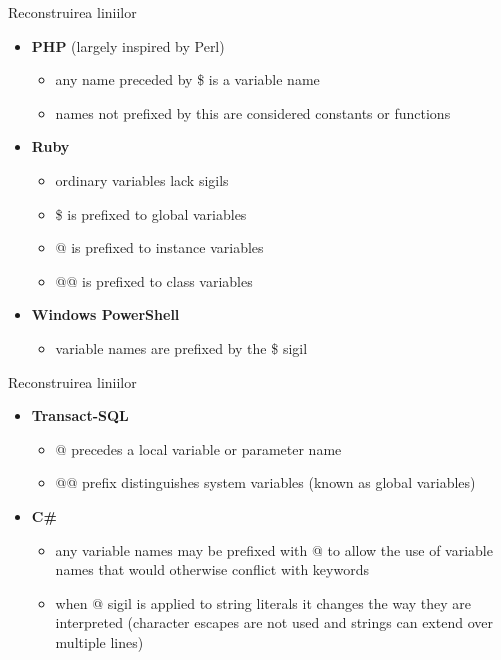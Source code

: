 \documentclass[pdf]{beamer}
\begin{document}
\begin{frame}{Reconstruirea liniilor}
\begin{itemize}
\item
\textbf{PHP} (largely inspired by Perl)
\begin{itemize}
\item
any name preceded by \$ is a variable name
\item
names not prefixed by this are considered constants or functions
\end{itemize}

\item
\textbf{Ruby}
\begin{itemize}
\item
ordinary variables lack sigils
\item
\$ is prefixed to global variables
\item
@ is prefixed to instance variables
\item
@@ is prefixed to class variables 
\end{itemize}

\item
\textbf{Windows PowerShell}
\begin{itemize}
\item
variable names are prefixed by the \$ sigil
\end{itemize}
\end{itemize}
\end{frame}



\begin{frame}{Reconstruirea liniilor}
\begin{itemize}
\item
\textbf{Transact-SQL}
\begin{itemize}
\item
@ precedes a local variable or parameter name
\item
@@ prefix distinguishes system variables (known as global variables)
\end{itemize}

\item
\textbf{C\#}
\begin{itemize}
\item
any variable names may be prefixed with @ to allow the use of variable names that would otherwise conflict with keywords
\item
when @ sigil is applied to string literals it changes the way they are interpreted (character escapes are not used and strings can extend over multiple lines)
\end{itemize}
\end{itemize}
\end{frame}
\end{document}
